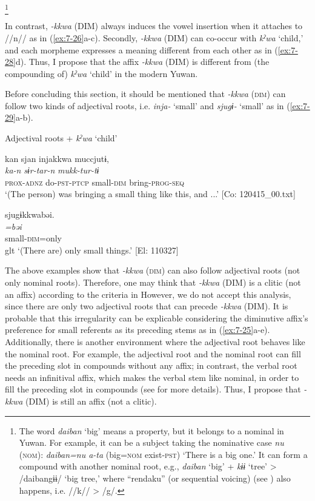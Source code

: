 \footnote{The word \textit{daiban} ‘big’ means a property, but it belongs to a nominal in Yuwan. For example, it can be a subject taking the nominative case \textit{nu} (\textsc{nom}): \textit{daiban=nu a-ta} (big=\textsc{nom} exist-\textsc{pst}) ‘There is a big one.’ It can form a compound with another nominal root, e.g., \textit{daiban} ‘big’ + \textit{kɨɨ} ‘tree’ > /daibangɨɨ/ ‘big tree,’ where “rendaku” (or sequential voicing) (see ) also happens, i.e. //k// > /g/.}

In contrast, \textit{{}-kkwa} (DIM) always induces the vowel insertion when it attaches to //n// as in (\ref{ex:7-26}a-c). Secondly, \textit{{}-kkwa} (DIM) can co-occur with \textit{kˀwa} ‘child,’ and each morpheme expresses a meaning different from each other as in (\ref{ex:7-28}d). Thus, I propose that the affix \textit{{}-kkwa} (DIM) is different from (the compounding of) \textit{kˀwa} ‘child’ in the modern Yuwan.

  Before concluding this section, it should be mentioned that \textit{{}-kkwa} (\textsc{dim}) can follow two kinds of adjectival roots, i.e. \textit{inja-} ‘small’ and \textit{sjugɨ-} ‘small’ as in (\ref{ex:7-29}a-b).

\ea \label{ex:7:29}  Adjectival roots + \textit{kˀwa} ‘child’

\ea \label{ex:7:a}{\TM}
\glll  kan  sjan  injakkwa  muccjutɨ,\\
\textit{ka-n}  \textit{sɨr-tar-n}  \textit{}  \textit{mukk-tur-tɨ}\\
\textsc{prox}-\textsc{adnz}  do-\textsc{pst}-\textsc{ptcp}  small-\textsc{dim}  bring-\textsc{prog}-\textsc{seq}\\
\glt ‘(The person) was bringing a small thing like this, and ...’ [Co: 120415\_00.txt]

\ex \label{ex:7:b}{\TM}
\glll  sjugɨkkwabəi.\\
\textit{=bəi}\\
small-\textsc{dim}=only\\
glt ‘(There are) only small things.’ [El: 110327]

\z
\z

The above examples show that \textit{{}-kkwa} (\textsc{dim}) can also follow adjectival roots (not only nominal roots). Therefore, one may think that \textit{{}-kkwa} (DIM) is a clitic (not an affix) according to the criteria in  However, we do not accept this analysis, since there are only two adjectival roots that can precede \textit{-kkwa} (DIM). It is probable that this irregularity can be explicable considering the diminutive affix’s preference for small referents as its preceding stems as in (\ref{ex:7-25}a-e). Additionally, there is another environment where the adjectival root behaves like the nominal root. For example, the adjectival root and the nominal root can fill the preceding slot in compounds without any affix; in contrast, the verbal root needs an infinitival affix, which makes the verbal stem like nominal, in order to fill the preceding slot in compounds (see  for more details). Thus, I propose that \textit{{}-kkwa} (DIM) is still an affix (not a clitic).

